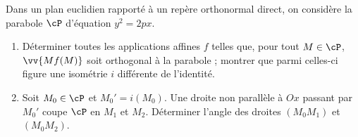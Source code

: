 \begin{enonce}
\begin{exercise}[ID={Cahier RMS4 164 (Mines)},subtitle={},tags={}]
Dans un plan euclidien rapporté à un repère orthonormal direct, on considère la parabole $\cP$ d'équation $y^2=2px$.
\begin{enumerate}
  \item Déterminer toutes les applications affines $f$ telles que, pour tout $M\in \cP$, $\vv{Mf(M)}$ soit orthogonal à la parabole ; montrer que parmi celles-ci figure une isométrie $i$ différente de l'identité.
  \item
    Soit $M_0\in\cP$ et $M_0'=i(M_0)$.
    Une droite non parallèle à $Ox$ passant par $M_0'$ coupe $\cP$ en $M_1$ et $M_2$.
    Déterminer l'angle des droites $(M_0M_1)$ et $(M_0M_2)$.
\end{enumerate}
\end{exercise}
\begin{solution}
\end{solution}
\end{enonce}
